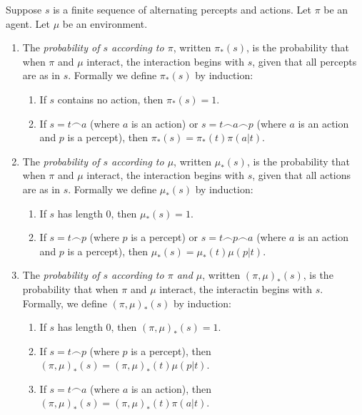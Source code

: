\documentclass[runningheads]{llncs}
\begin{document}
\begin{definition}
\label{pullbackdef}
    Suppose $s$ is a finite sequence of alternating percepts and actions.
    Let $\pi$ be an agent. Let $\mu$ be an environment.
    \begin{enumerate}
        \item
        The \emph{probability of $s$ according to $\pi$}, written
        $\pi_*(s)$, is the probability that when $\pi$ and $\mu$ interact,
        the interaction begins with $s$, given that all
        percepts are as in $s$. Formally we define $\pi_*(s)$ by induction:
        \begin{enumerate}
            \item
            If $s$ contains no action, then $\pi_*(s)=1$.
            \item
            If $s=t\frown a$ (where $a$ is an action) or $s=t\frown a\frown p$
            (where $a$ is an action and $p$ is a percept),
            then $\pi_*(s)=\pi_*(t)\pi(a|t)$.
        \end{enumerate}
        \item
        The \emph{probability of $s$ according to $\mu$}, written
        $\mu_*(s)$, is the probability that when $\pi$ and $\mu$ interact,
        the interaction begins with $s$, given that all
        actions are as in $s$. Formally we define $\mu_*(s)$ by induction:
        \begin{enumerate}
            \item
            If $s$ has length $0$, then $\mu_*(s)=1$.
            \item
            If $s=t\frown p$ (where $p$ is a percept) or $s=t\frown p\frown a$
            (where $a$ is an action and $p$ is a percept),
            then $\mu_*(s)=\mu_*(t)\mu(p|t)$.
        \end{enumerate}
        \item
        The \emph{probability of $s$ according to $\pi$ and $\mu$},
        written $(\pi,\mu)_*(s)$, is the probability that when $\pi$ and
        $\mu$ interact, the interactin begins with $s$.
        Formally, we define $(\pi,\mu)_*(s)$ by induction:
        \begin{enumerate}
            \item
            If $s$ has length $0$, then $(\pi,\mu)_*(s)=1$.
            \item
            If $s=t\frown p$ (where $p$ is a percept),
            then $(\pi,\mu)_*(s)=(\pi,\mu)_*(t)\mu(p|t)$.
            \item
            If $s=t\frown a$ (where $a$ is an action),
            then $(\pi,\mu)_*(s)=(\pi,\mu)_*(t)\pi(a|t)$.
        \end{enumerate}
    \end{enumerate}
\end{definition}
\end{document}
